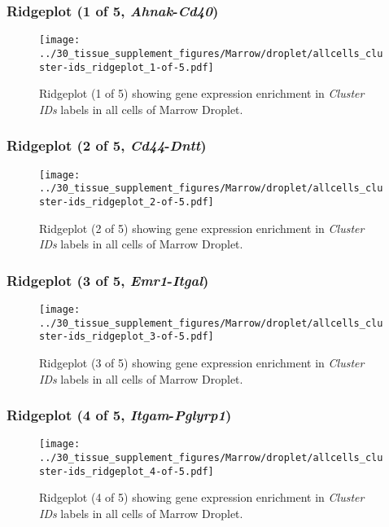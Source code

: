 \clearpage

\subsubsection{Ridgeplot (1 of 5, \emph{Ahnak}-\emph{Cd40})}
\begin{figure}[h]
\centering
\texttt{[image: ../30\_tissue\_supplement\_figures/Marrow/droplet/allcells\_cluster-ids\_ridgeplot\_1-of-5.pdf]}

\caption{ Ridgeplot (1 of 5)  showing gene expression enrichment in \emph{Cluster IDs} labels in all cells of Marrow Droplet. }
\end{figure}


\clearpage

\subsubsection{Ridgeplot (2 of 5, \emph{Cd44}-\emph{Dntt})}
\begin{figure}[h]
\centering
\texttt{[image: ../30\_tissue\_supplement\_figures/Marrow/droplet/allcells\_cluster-ids\_ridgeplot\_2-of-5.pdf]}

\caption{ Ridgeplot (2 of 5)  showing gene expression enrichment in \emph{Cluster IDs} labels in all cells of Marrow Droplet. }
\end{figure}


\clearpage

\subsubsection{Ridgeplot (3 of 5, \emph{Emr1}-\emph{Itgal})}
\begin{figure}[h]
\centering
\texttt{[image: ../30\_tissue\_supplement\_figures/Marrow/droplet/allcells\_cluster-ids\_ridgeplot\_3-of-5.pdf]}

\caption{ Ridgeplot (3 of 5)  showing gene expression enrichment in \emph{Cluster IDs} labels in all cells of Marrow Droplet. }
\end{figure}


\clearpage

\subsubsection{Ridgeplot (4 of 5, \emph{Itgam}-\emph{Pglyrp1})}
\begin{figure}[h]
\centering
\texttt{[image: ../30\_tissue\_supplement\_figures/Marrow/droplet/allcells\_cluster-ids\_ridgeplot\_4-of-5.pdf]}

\caption{ Ridgeplot (4 of 5)  showing gene expression enrichment in \emph{Cluster IDs} labels in all cells of Marrow Droplet. }
\end{figure}


